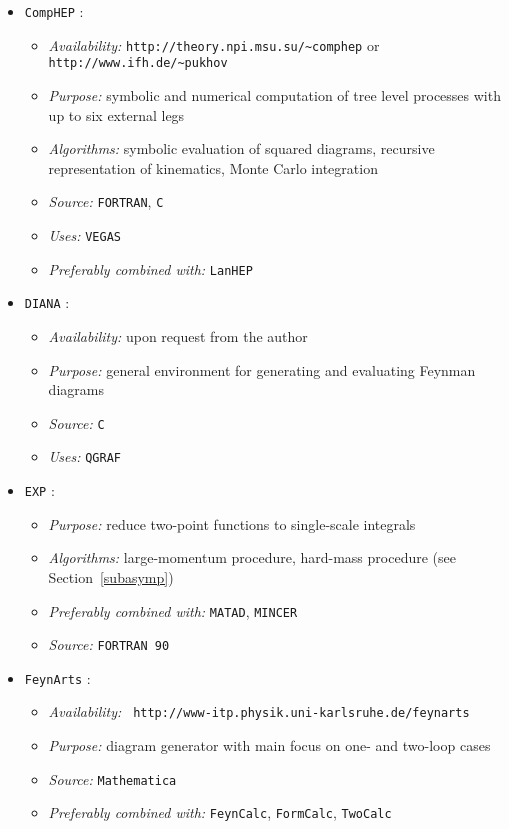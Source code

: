 \begin{itemize}
\item {\tt CompHEP} \cite{comphep}:
  \begin{itemize} 
  \item {\it Availability:} {\tt http://theory.npi.msu.su/\~\/comphep}
    or {\tt http://www.ifh.de/\~\/pukhov}
  \item {\it Purpose:} symbolic and numerical computation of tree level
    processes with up to six external legs
  \item {\it Algorithms:} symbolic evaluation of squared diagrams,
    recursive representation of kinematics, Monte Carlo integration
  \item{\it Source:} {\tt FORTRAN}, {\tt C}
  \item{\it Uses:} {\tt VEGAS}
  \item {\it Preferably combined with:} {\tt LanHEP}
  \end{itemize}


\item {\tt DIANA} \cite{diana}:
  \begin{itemize}
  \item{\it Availability:} upon request from the author
  \item{\it Purpose:} general environment for generating and evaluating
    Feynman diagrams
  \item{\it Source:} {\tt C}
  \item{\it Uses:} {\tt QGRAF}
  \end{itemize}


\item {\tt EXP} \cite{Sei:dipl}:
  \begin{itemize}
  \item{\it Purpose:} reduce two-point functions to single-scale integrals
  \item{\it Algorithms:} large-momentum procedure, hard-mass procedure
    (see Section~\ref{subasymp})
  \item {\it Preferably combined with:} {\tt MATAD}, {\tt MINCER}
  \item{\it Source:} {\tt FORTRAN~90}
  \end{itemize}


\item {\tt FeynArts} \cite{FeynArts}:
  \begin{itemize}
  \item{\it Availability:} {\tt
      http://www-itp.physik.uni-karlsruhe.de/feynarts}
  \item{\it Purpose:} diagram generator with main focus on one- and
    two-loop cases
  \item{\it Source:} {\tt Mathematica}
  \item{\it Preferably combined with:} {\tt FeynCalc}, {\tt FormCalc}, 
    {\tt TwoCalc}
  \end{itemize}


\end{itemize}
